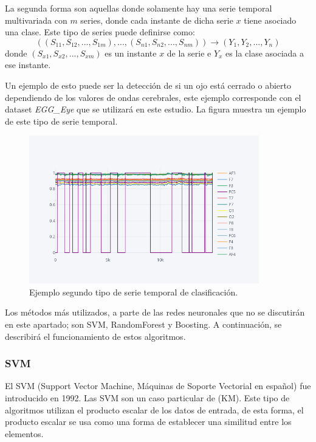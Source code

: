 La segunda forma son aquellas donde solamente hay una serie temporal multivariada con $m$ series, donde cada instante de dicha serie $x$ tiene asociado una clase. Este tipo de series puede definirse como:\newline
$$ ((S_{11},S_{12}, ..., S_{1m}), ...,(S_{n1},S_{n2}, ..., S_{nm})) \rightarrow (Y_1, Y_2, ..., Y_n) $$
\noindent donde $(S_{x1}, S_{x2}, ..., S_{xm})$ es un instante $x$ de la serie e $Y_x$ es la clase asociada a ese instante.\newline

Un ejemplo de esto puede ser la detección de si un ojo está cerrado o abierto dependiendo de los valores de ondas cerebrales, este ejemplo corresponde con el dataset \textit{EGG\_Eye} que se utilizará en este estudio. La figura muestra un ejemplo de este tipo de serie temporal.\newline
\newpage

\begin{figure}[H]
	\centering
	\includegraphics[width=100mm]{imagenes/egg_eye_example.png}
	\caption{Ejemplo segundo tipo de serie temporal de clasificación.}
	\label{fig:egg_eye_example}
\end{figure}
\verticalspace

Los métodos más utilizados, a parte de las redes neuronales que no se discutirán en este apartado; son SVM, RandomForest y Boosting. A continuación, se describirá el funcionamiento de estos algoritmos.\newline

\subsubsection{SVM}
El SVM (Support Vector Machine, Máquinas de Soporte Vectorial en español) \cite{boser1992training} fue introducido en 1992. Las SVM son un caso particular de  (KM). Este tipo de algoritmos utilizan el producto escalar de los datos de entrada, de esta forma, el producto escalar se usa como una forma de establecer una similitud entre los elementos.\newline

